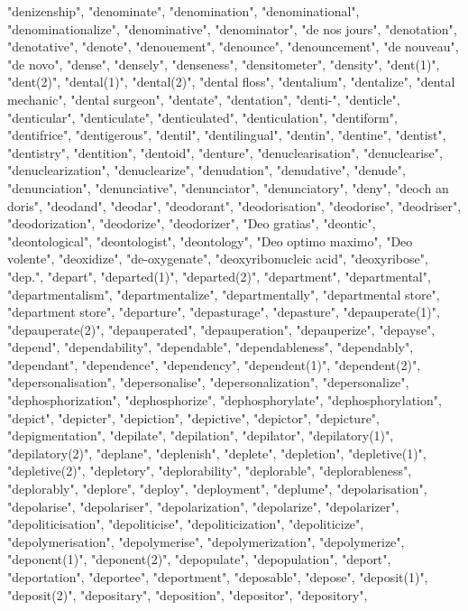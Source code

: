 "denizenship",
"denominate",
"denomination",
"denominational",
"denominationalize",
"denominative",
"denominator",
"de nos jours",
"denotation",
"denotative",
"denote",
"denouement",
"denounce",
"denouncement",
"de nouveau",
"de novo",
"dense",
"densely",
"denseness",
"densitometer",
"density",
"dent(1)",
"dent(2)",
"dental(1)",
"dental(2)",
"dental floss",
"dentalium",
"dentalize",
"dental mechanic",
"dental surgeon",
"dentate",
"dentation",
"denti-",
"denticle",
"denticular",
"denticulate",
"denticulated",
"denticulation",
"dentiform",
"dentifrice",
"dentigerous",
"dentil",
"dentilingual",
"dentin",
"dentine",
"dentist",
"dentistry",
"dentition",
"dentoid",
"denture",
"denuclearisation",
"denuclearise",
"denuclearization",
"denuclearize",
"denudation",
"denudative",
"denude",
"denunciation",
"denunciative",
"denunciator",
"denunciatory",
"deny",
"deoch an doris",
"deodand",
"deodar",
"deodorant",
"deodorisation",
"deodorise",
"deodriser",
"deodorization",
"deodorize",
"deodorizer",
"Deo gratias",
"deontic",
"deontological",
"deontologist",
"deontology",
"Deo optimo maximo",
"Deo volente",
"deoxidize",
"de-oxygenate",
"deoxyribonucleic acid",
"deoxyribose",
"dep.",
"depart",
"departed(1)",
"departed(2)",
"department",
"departmental",
"departmentalism",
"departmentalize",
"departmentally",
"departmental store",
"department store",
"departure",
"depasturage",
"depasture",
"depauperate(1)",
"depauperate(2)",
"depauperated",
"depauperation",
"depauperize",
"depayse",
"depend",
"dependability",
"dependable",
"dependableness",
"dependably",
"dependant",
"dependence",
"dependency",
"dependent(1)",
"dependent(2)",
"depersonalisation",
"depersonalise",
"depersonalization",
"depersonalize",
"dephosphorization",
"dephosphorize",
"dephosphorylate",
"dephosphorylation",
"depict",
"depicter",
"depiction",
"depictive",
"depictor",
"depicture",
"depigmentation",
"depilate",
"depilation",
"depilator",
"depilatory(1)",
"depilatory(2)",
"deplane",
"deplenish",
"deplete",
"depletion",
"depletive(1)",
"depletive(2)",
"depletory",
"deplorability",
"deplorable",
"deplorableness",
"deplorably",
"deplore",
"deploy",
"deployment",
"deplume",
"depolarisation",
"depolarise",
"depolariser",
"depolarization",
"depolarize",
"depolarizer",
"depoliticisation",
"depoliticise",
"depoliticization",
"depoliticize",
"depolymerisation",
"depolymerise",
"depolymerization",
"depolymerize",
"deponent(1)",
"deponent(2)",
"depopulate",
"depopulation",
"deport",
"deportation",
"deportee",
"deportment",
"deposable",
"depose",
"deposit(1)",
"deposit(2)",
"depositary",
"deposition",
"depositor",
"depository",
